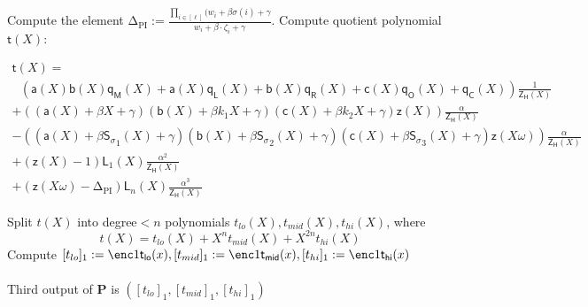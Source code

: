 \documentclass[11pt]{article} %
\newcommand{\pubinputdelta}{\ensuremath{\mathrm{\Delta_{\mathrm{PI}}}}\xspace}
\newcommand{\defeq}{:=}
\newcommand{\prv}{\ensuremath{\mathsf{\mathbf{P}}}\xspace}
\newcommand{\sigpoly}{\ensuremath{\mathsf{S_{\sigma}}}\xspace}
\newcommand{\ZeroH}{\ensuremath{Z_{H}} \xspace}
\newcommand{\lpoly}{\ensuremath{\mathsf{a}}\xspace}
\newcommand{\rpoly}{\ensuremath{\mathsf{b}}\xspace}
\newcommand{\opoly}{\ensuremath{\mathsf{c}}\xspace}
\newcommand{\idpermpoly}{\ensuremath{\mathsf{z}}\xspace}
\newcommand{\lagrangepoly}{\ensuremath{\mathsf{L}}\xspace}
\newcommand{\zeropoly}{\ensuremath{\mathsf{\ZeroH}}\xspace}
\newcommand{\snark}{\ensuremath{\mathsf{snark(\lambda)}}\xspace}
\newcommand{\Prove}{\mathcal{P}}
\newcommand{\Psnark}{\prv}%
\begin{document}
	Compute the element $\pubinputdelta \defeq \frac{\prod_{i\in [\ell]} (w_i + \beta \sigma(i) +\gamma}{w_i + \beta \cdot \zeta_i + \gamma}$.
	Compute quotient polynomial $\mathsf{t}(X):$
	\begin{adjustwidth*}{-22mm}{-22mm}
	$$
	\begin{array}{l}
	\mathsf{t}(X) = \\
	\ \ \ \left( \lpoly(X)\rpoly(X)\mathsf{q_M}(X) + \lpoly(X)\mathsf{q_L}(X) + \rpoly(X)\mathsf{q_R}(X) + \opoly(X)\mathsf{q_O}(X) + \mathsf{q_C}(X) \right) \frac{1}{\zeropoly(X)} \\
	+ \left((\lpoly(X) + \beta X + \gamma)(\rpoly(X) + \beta k_1 X + \gamma)(\opoly(X) + \beta k_2 X + \gamma )\idpermpoly(X) \right) \frac{\alpha}{\zeropoly(X)} \\
	- \left((\lpoly(X) + \beta \sigpoly_1(X) + \gamma)(\rpoly(X) + \beta \sigpoly_2(X) + \gamma)(\opoly(X) + \beta \sigpoly_3(X) + \gamma) \idpermpoly(X\omega) \right)\frac{\alpha}{\zeropoly(X)} \\
	+ \left(\idpermpoly(X) - 1 \right) \lagrangepoly_1(X) \frac{\alpha^2}{\zeropoly(X)}\\
+   (\idpermpoly(X\omega)-\pubinputdelta)  \lagrangepoly_n(X) \frac{\alpha^3}{\zeropoly(X)}	\end{array}
	$$
	\end{adjustwidth*}
	Split $t(X)$ into degree$<n$ polynomials $t_{lo}(X), t_{mid}(X), t_{hi}(X)$, where
	$$
	t(X) = t_{lo}(X) + X^nt_{mid}(X) + X^{2n}t_{hi}(X)
	$$
	Compute $[t_{lo}]_{1} := \enc1{\mathsf{t_{lo}}(x)}, [t_{mid}]_1 := \enc1{\mathsf{t_{mid}}(x)}, [t_{hi}]_1 := \enc1{\mathsf{t_{hi}}(x)}$ \\ \\
	Third output of $\Psnark$ is $([t_{lo}]_1, [t_{mid}]_1, [t_{hi}]_1)$
	\\ \\
	\noindent
\end{document}
